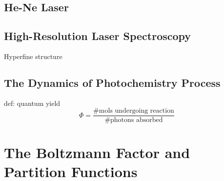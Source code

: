 \documentclass[a4paper]{article}
\numberwithin{equation}{section}
\begin{document}
\subsection{He-Ne Laser}
\subsection{High-Resolution Laser Spectroscopy}
Hyperfine structure
\subsection{The Dynamics of Photochemistry Process}
def: quantum yield
\begin{equation}\label{key}
\Phi = \dfrac{\text{\# mols undergoing reaction}}{\text{\# photons absorbed}}
\end{equation}

\section{The Boltzmann Factor and Partition Functions}
\end{document}
